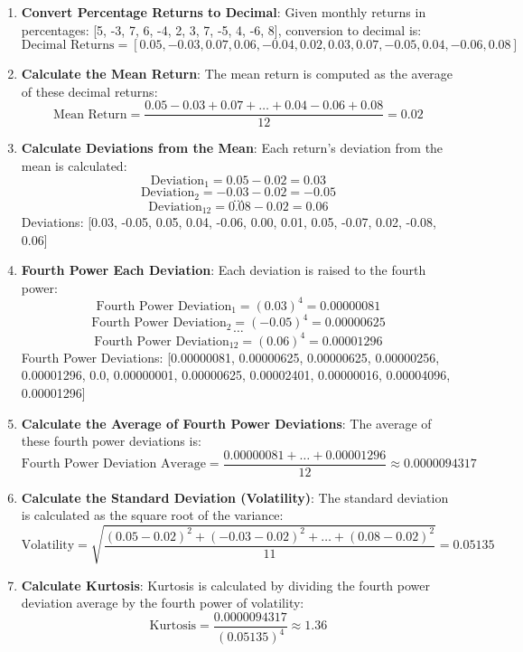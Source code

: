 \documentclass{article}
\begin{document}
\begin{enumerate}
    \item \textbf{Convert Percentage Returns to Decimal}:
    Given monthly returns in percentages: [5, -3, 7, 6, -4, 2, 3, 7, -5, 4, -6, 8], conversion to decimal is:
    \[ \text{Decimal Returns} = [0.05, -0.03, 0.07, 0.06, -0.04, 0.02, 0.03, 0.07, -0.05, 0.04, -0.06, 0.08] \]

    \item \textbf{Calculate the Mean Return}:
    The mean return is computed as the average of these decimal returns:
    \[ \text{Mean Return} = \frac{0.05 - 0.03 + 0.07 + \ldots + 0.04 - 0.06 + 0.08}{12} = 0.02 \]

    \item \textbf{Calculate Deviations from the Mean}:
    Each return's deviation from the mean is calculated:
    \[ \text{Deviation}_1 = 0.05 - 0.02 = 0.03 \] 
    \[ \text{Deviation}_2 = -0.03 - 0.02 = -0.05 \] 
    \[ \ldots \] 
    \[ \text{Deviation}_{12} = 0.08 - 0.02 = 0.06 \]
    Deviations: [0.03, -0.05, 0.05, 0.04, -0.06, 0.00, 0.01, 0.05, -0.07, 0.02, -0.08, 0.06]

    \item \textbf{Fourth Power Each Deviation}:
    Each deviation is raised to the fourth power:
    \[ \text{Fourth Power Deviation}_1 = (0.03)^4 = 0.00000081 \] 
    \[ \text{Fourth Power Deviation}_2 = (-0.05)^4 = 0.00000625 \] 
    \[ \ldots \] 
    \[ \text{Fourth Power Deviation}_{12} = (0.06)^4 = 0.00001296 \]
    Fourth Power Deviations: [0.00000081, 0.00000625, 0.00000625, 0.00000256, 0.00001296, 0.0, 0.00000001, 0.00000625, 0.00002401, 0.00000016, 0.00004096, 0.00001296]

    \item \textbf{Calculate the Average of Fourth Power Deviations}:
    The average of these fourth power deviations is:
    \[ \text{Fourth Power Deviation Average} = \frac{0.00000081 +  \ldots + 0.00001296}{12} \approx 0.0000094317 \]

    \item \textbf{Calculate the Standard Deviation (Volatility)}:
    The standard deviation is calculated as the square root of the variance:
    \[ \text{Volatility} = \sqrt{\frac{(0.05 - 0.02)^2 + (-0.03 - 0.02)^2 + \ldots + (0.08 - 0.02)^2}{11}} = 0.05135 \]

    \item \textbf{Calculate Kurtosis}:
    Kurtosis is calculated by dividing the fourth power deviation average by the fourth power of volatility:
    \[ \text{Kurtosis} = \frac{0.0000094317}{(0.05135)^4} \approx 1.36 \]
\end{enumerate}
\end{document}

